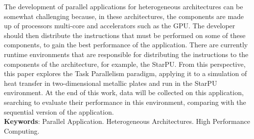
\begin{resumo}[ABSTRACT]
\begin{SingleSpacing}


The development of parallel applications for heterogeneous architectures can be somewhat challenging because,
in these architectures, the components are made up of processors multi-core and accelerators such as the GPU.
The developer should then distribute the instructions that must be performed on some of these components,
to gain the best performance of the application. There are currently runtime environments that are responsible
for distributing the instructions to the components of the architecture, for example, the StarPU.
From this perspective, this paper explores the Task Parallelism paradigm, applying it to a simulation of heat transfer in two-dimensional metallic plates and run in the StarPU  environment.
At the end of this work, data will be collected on this application,
searching to evaluate their performance in this environment, comparing with the sequential version of the application.\\

\textbf{Keywords}: Parallel Application. Heterogeneous Architectures. High Performance Computing.

\end{SingleSpacing}
\end{resumo}

